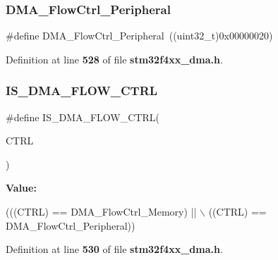 \subsubsection{D\+M\+A\+\_\+\+Flow\+Ctrl\+\_\+\+Peripheral}
{\footnotesize\ttfamily \#define D\+M\+A\+\_\+\+Flow\+Ctrl\+\_\+\+Peripheral~((uint32\+\_\+t)0x00000020)}



Definition at line \textbf{ 528} of file \textbf{ stm32f4xx\+\_\+dma.\+h}.

\mbox{\label{group__DMA__flow__controller__definitions_ga78c0f18c0a86c67510f540a4210aadb7}} 
\subsubsection{I\+S\+\_\+\+D\+M\+A\+\_\+\+F\+L\+O\+W\+\_\+\+C\+T\+RL}
{\footnotesize\ttfamily \#define I\+S\+\_\+\+D\+M\+A\+\_\+\+F\+L\+O\+W\+\_\+\+C\+T\+RL(\begin{DoxyParamCaption}\item[{}]{C\+T\+RL }\end{DoxyParamCaption})}

{\bfseries Value\+:}
\begin{DoxyCode}
(((CTRL) == DMA_FlowCtrl_Memory) || \(\backslash\)
                                ((CTRL) == DMA_FlowCtrl_Peripheral))
\end{DoxyCode}


Definition at line \textbf{ 530} of file \textbf{ stm32f4xx\+\_\+dma.\+h}.

